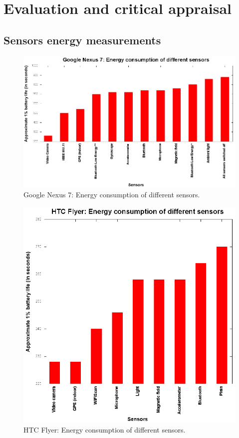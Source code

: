 \section{Evaluation and critical appraisal}
\label{s:evaluation}
\subsection{Sensors energy measurements}
\begin{figure}[H]
\centering
\includegraphics[scale=1.5]{plots/google_nexus_7.eps}
\caption{Google Nexus 7: Energy  consumption of different sensors.}
\end{figure}


\begin{figure}[H]
\centering
\includegraphics[scale=1.5]{plots/htc_flyer.eps}
\caption{HTC Flyer: Energy  consumption of different sensors.}
\end{figure}

